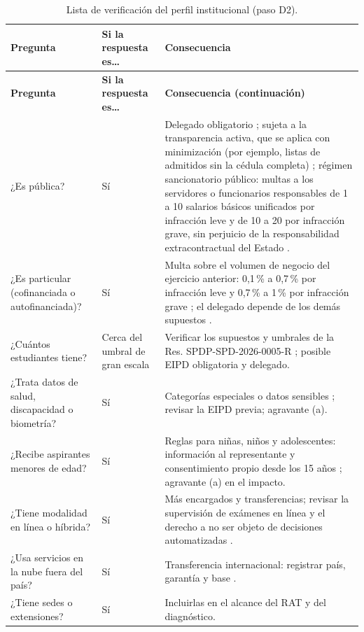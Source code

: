 {\scriptsize
\renewcommand{\arraystretch}{1.15}
\begin{xltabular}{\textwidth}{|>{\raggedright\arraybackslash}p{3.4cm}|>{\raggedright\arraybackslash}p{1.6cm}|L|}
  \caption{Lista de verificación del perfil institucional (paso D2).}
  \label{tab:perfil_institucional} \\
  \hline
  \textbf{Pregunta} & \textbf{Si la respuesta es\ldots} & \textbf{Consecuencia} \\
  \hline
  \endfirsthead
  \hline
  \textbf{Pregunta} & \textbf{Si la respuesta es\ldots} & \textbf{Consecuencia (continuación)} \\
  \hline
  \endhead
  \hline
  \endlastfoot
  ¿Es pública? & Sí & Delegado obligatorio \cite[art.~48, num.~1]{lopdp2021}; sujeta a la transparencia activa, que se aplica con minimización (por ejemplo, listas de admitidos sin la cédula completa) \cite[arts.~4, num.~5, 8, lit.~g, 9 y 19]{lotaip2023}; régimen sancionatorio público: multas a los servidores o funcionarios responsables de 1 a 10 salarios básicos unificados por infracción leve y de 10 a 20 por infracción grave, sin perjuicio de la responsabilidad extracontractual del Estado \cite[arts.~71 y 72]{lopdp2021}. \\ \hline
  ¿Es particular (cofinanciada o autofinanciada)? & Sí & Multa sobre el volumen de negocio del ejercicio anterior: 0,1\,\% a 0,7\,\% por infracción leve y 0,7\,\% a 1\,\% por infracción grave \cite[arts.~71 y 72]{lopdp2021}; el delegado depende de los demás supuestos \cite[art.~48, nums.~2 y 3]{lopdp2021}. \\ \hline
  ¿Cuántos estudiantes tiene? & Cerca del umbral de gran escala & Verificar los supuestos y umbrales de la Res. SPDP-SPD-2026-0005-R \cite{spdp2026granescala}; posible EIPD obligatoria y delegado. \\ \hline
  ¿Trata datos de salud, discapacidad o biometría? & Sí & Categorías especiales o datos sensibles \cite[arts.~4, 25 y 26]{lopdp2021}; revisar la EIPD previa; agravante (a). \\ \hline
  ¿Recibe aspirantes menores de edad? & Sí & Reglas para niñas, niños y adolescentes: información al representante y consentimiento propio desde los 15 años \cite[arts.~12, 21, 24 y 25]{lopdp2021}; agravante (a) en el impacto. \\ \hline
  ¿Tiene modalidad en línea o híbrida? & Sí & Más encargados y transferencias; revisar la supervisión de exámenes en línea y el derecho a no ser objeto de decisiones automatizadas \cite[art.~20]{lopdp2021}. \\ \hline
  ¿Usa servicios en la nube fuera del país? & Sí & Transferencia internacional: registrar país, garantía y base \cite[arts.~55 a 59]{lopdp2021}. \\ \hline
  ¿Tiene sedes o extensiones? & Sí & Incluirlas en el alcance del RAT y del diagnóstico. \\ \hline
\end{xltabular}
}
{\raggedright{}\par}



